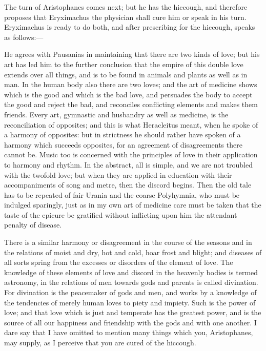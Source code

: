 \documentclass[11pt,letter]{article}
\begin{document}
\par  The turn of Aristophanes comes next; but he has the hiccough, and therefore proposes that Eryximachus the physician shall cure him or speak in his turn. Eryximachus is ready to do both, and after prescribing for the hiccough, speaks as follows:—

\par  He agrees with Pausanias in maintaining that there are two kinds of love; but his art has led him to the further conclusion that the empire of this double love extends over all things, and is to be found in animals and plants as well as in man. In the human body also there are two loves; and the art of medicine shows which is the good and which is the bad love, and persuades the body to accept the good and reject the bad, and reconciles conflicting elements and makes them friends. Every art, gymnastic and husbandry as well as medicine, is the reconciliation of opposites; and this is what Heracleitus meant, when he spoke of a harmony of opposites: but in strictness he should rather have spoken of a harmony which succeeds opposites, for an agreement of disagreements there cannot be. Music too is concerned with the principles of love in their application to harmony and rhythm. In the abstract, all is simple, and we are not troubled with the twofold love; but when they are applied in education with their accompaniments of song and metre, then the discord begins. Then the old tale has to be repeated of fair Urania and the coarse Polyhymnia, who must be indulged sparingly, just as in my own art of medicine care must be taken that the taste of the epicure be gratified without inflicting upon him the attendant penalty of disease.

\par  There is a similar harmony or disagreement in the course of the seasons and in the relations of moist and dry, hot and cold, hoar frost and blight; and diseases of all sorts spring from the excesses or disorders of the element of love. The knowledge of these elements of love and discord in the heavenly bodies is termed astronomy, in the relations of men towards gods and parents is called divination. For divination is the peacemaker of gods and men, and works by a knowledge of the tendencies of merely human loves to piety and impiety. Such is the power of love; and that love which is just and temperate has the greatest power, and is the source of all our happiness and friendship with the gods and with one another. I dare say that I have omitted to mention many things which you, Aristophanes, may supply, as I perceive that you are cured of the hiccough.
\end{document}
